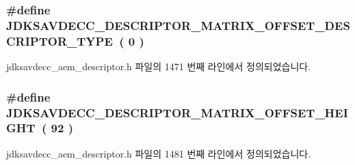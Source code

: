 \subsubsection[{\texorpdfstring{J\+D\+K\+S\+A\+V\+D\+E\+C\+C\+\_\+\+D\+E\+S\+C\+R\+I\+P\+T\+O\+R\+\_\+\+M\+A\+T\+R\+I\+X\+\_\+\+O\+F\+F\+S\+E\+T\+\_\+\+D\+E\+S\+C\+R\+I\+P\+T\+O\+R\+\_\+\+T\+Y\+PE}{JDKSAVDECC_DESCRIPTOR_MATRIX_OFFSET_DESCRIPTOR_TYPE}}]{\setlength{\rightskip}{0pt plus 5cm}\#define J\+D\+K\+S\+A\+V\+D\+E\+C\+C\+\_\+\+D\+E\+S\+C\+R\+I\+P\+T\+O\+R\+\_\+\+M\+A\+T\+R\+I\+X\+\_\+\+O\+F\+F\+S\+E\+T\+\_\+\+D\+E\+S\+C\+R\+I\+P\+T\+O\+R\+\_\+\+T\+Y\+PE~( 0 )}\hypertarget{group__descriptor__matrix_gac508a3e60a3848d70e10eb9d85f8b153}{}\label{group__descriptor__matrix_gac508a3e60a3848d70e10eb9d85f8b153}


jdksavdecc\+\_\+aem\+\_\+descriptor.\+h 파일의 1471 번째 라인에서 정의되었습니다.

\subsubsection[{\texorpdfstring{J\+D\+K\+S\+A\+V\+D\+E\+C\+C\+\_\+\+D\+E\+S\+C\+R\+I\+P\+T\+O\+R\+\_\+\+M\+A\+T\+R\+I\+X\+\_\+\+O\+F\+F\+S\+E\+T\+\_\+\+H\+E\+I\+G\+HT}{JDKSAVDECC_DESCRIPTOR_MATRIX_OFFSET_HEIGHT}}]{\setlength{\rightskip}{0pt plus 5cm}\#define J\+D\+K\+S\+A\+V\+D\+E\+C\+C\+\_\+\+D\+E\+S\+C\+R\+I\+P\+T\+O\+R\+\_\+\+M\+A\+T\+R\+I\+X\+\_\+\+O\+F\+F\+S\+E\+T\+\_\+\+H\+E\+I\+G\+HT~( 92 )}\hypertarget{group__descriptor__matrix_ga07d49694a8b142abb1019ea6db0f88e5}{}\label{group__descriptor__matrix_ga07d49694a8b142abb1019ea6db0f88e5}


jdksavdecc\+\_\+aem\+\_\+descriptor.\+h 파일의 1481 번째 라인에서 정의되었습니다.

